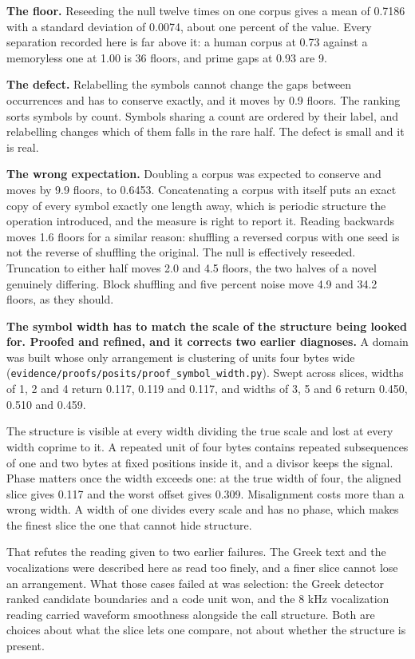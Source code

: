 \textbf{The floor.} Reseeding the null twelve times on one corpus gives a mean of 0.7186 with a standard deviation of 0.0074, about one percent of the value. Every separation recorded here is far above it: a human corpus at 0.73 against a memoryless one at 1.00 is 36 floors, and prime gaps at 0.93 are 9.

\textbf{The defect.} Relabelling the symbols cannot change the gaps between occurrences and has to conserve exactly, and it moves by 0.9 floors. The ranking sorts symbols by count. Symbols sharing a count are ordered by their label, and relabelling changes which of them falls in the rare half. The defect is small and it is real.

\textbf{The wrong expectation.} Doubling a corpus was expected to conserve and moves by 9.9 floors, to 0.6453. Concatenating a corpus with itself puts an exact copy of every symbol exactly one length away, which is periodic structure the operation introduced, and the measure is right to report it. Reading backwards moves 1.6 floors for a similar reason: shuffling a reversed corpus with one seed is not the reverse of shuffling the original. The null is effectively reseeded. Truncation to either half moves 2.0 and 4.5 floors, the two halves of a novel genuinely differing. Block shuffling and five percent noise move 4.9 and 34.2 floors, as they should.

\textbf{The symbol width has to match the scale of the structure being looked for. Proofed and refined, and it corrects two earlier diagnoses.} A domain was built whose only arrangement is clustering of units four bytes wide (\texttt{evidence/\allowbreak{}proofs/\allowbreak{}posits/\allowbreak{}proof\_\allowbreak{}symbol\_\allowbreak{}width.\allowbreak{}py}). Swept across slices, widths of 1, 2 and 4 return 0.117, 0.119 and 0.117, and widths of 3, 5 and 6 return 0.450, 0.510 and 0.459.

The structure is visible at every width dividing the true scale and lost at every width coprime to it. A repeated unit of four bytes contains repeated subsequences of one and two bytes at fixed positions inside it, and a divisor keeps the signal. Phase matters once the width exceeds one: at the true width of four, the aligned slice gives 0.117 and the worst offset gives 0.309. Misalignment costs more than a wrong width. A width of one divides every scale and has no phase, which makes the finest slice the one that cannot hide structure.

That refutes the reading given to two earlier failures. The Greek text and the vocalizations were described here as read too finely, and a finer slice cannot lose an arrangement. What those cases failed at was selection: the Greek detector ranked candidate boundaries and a code unit won, and the 8 kHz vocalization reading carried waveform smoothness alongside the call structure. Both are choices about what the slice lets one compare, not about whether the structure is present.

